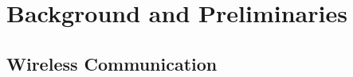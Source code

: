 \documentclass[10pt,a4paper]{article}
\begin{document}

%





\section{Background and Preliminaries}
\label{sec:background}

\subsection{Wireless Communication}
\label{wireless-comm}


\end{document}
